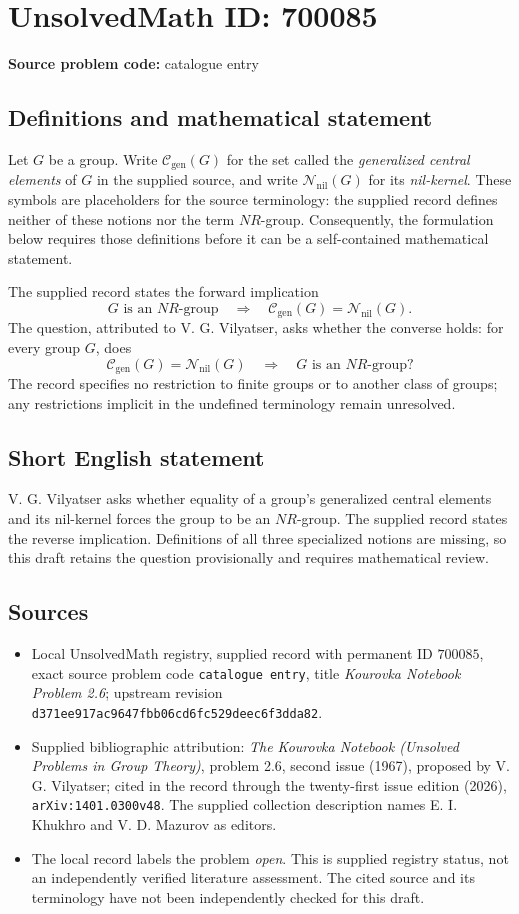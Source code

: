 \documentclass[11pt]{article}
\begin{document}
\section*{UnsolvedMath ID: 700085}
\textbf{Source problem code:} catalogue entry
\subsection{Definitions and mathematical statement}
Let \(G\) be a group. Write \(\mathcal C_{\mathrm{gen}}(G)\) for the set called the \emph{generalized central elements} of \(G\) in the supplied source, and write \(\mathcal N_{\mathrm{nil}}(G)\) for its \emph{nil-kernel}. These symbols are placeholders for the source terminology: the supplied record defines neither of these notions nor the term \(NR\)-group. Consequently, the formulation below requires those definitions before it can be a self-contained mathematical statement.

The supplied record states the forward implication
\[
G\text{ is an }NR\text{-group}
\quad\Longrightarrow\quad
\mathcal C_{\mathrm{gen}}(G)=\mathcal N_{\mathrm{nil}}(G).
\]
The question, attributed to V. G. Vilyatser, asks whether the converse holds: for every group \(G\), does
\[
\mathcal C_{\mathrm{gen}}(G)=\mathcal N_{\mathrm{nil}}(G)
\quad\Longrightarrow\quad
G\text{ is an }NR\text{-group}?
\]
The record specifies no restriction to finite groups or to another class of groups; any restrictions implicit in the undefined terminology remain unresolved.
\subsection{Short English statement}
V. G. Vilyatser asks whether equality of a group's generalized central elements and its nil-kernel forces the group to be an \(NR\)-group. The supplied record states the reverse implication. Definitions of all three specialized notions are missing, so this draft retains the question provisionally and requires mathematical review.
\subsection{Sources}
\begin{itemize}
\item Local UnsolvedMath registry, supplied record with permanent ID \(700085\), exact source problem code \texttt{catalogue entry}, title \emph{Kourovka Notebook Problem 2.6}; upstream revision \texttt{d371ee917ac9647fbb06cd6fc529deec6f3dda82}.
\item Supplied bibliographic attribution: \emph{The Kourovka Notebook (Unsolved Problems in Group Theory)}, problem 2.6, second issue (1967), proposed by V. G. Vilyatser; cited in the record through the twenty-first issue edition (2026), \texttt{arXiv:1401.0300v48}. The supplied collection description names E. I. Khukhro and V. D. Mazurov as editors.
\item The local record labels the problem \emph{open}. This is supplied registry status, not an independently verified literature assessment. The cited source and its terminology have not been independently checked for this draft.
\end{itemize}
\end{document}
